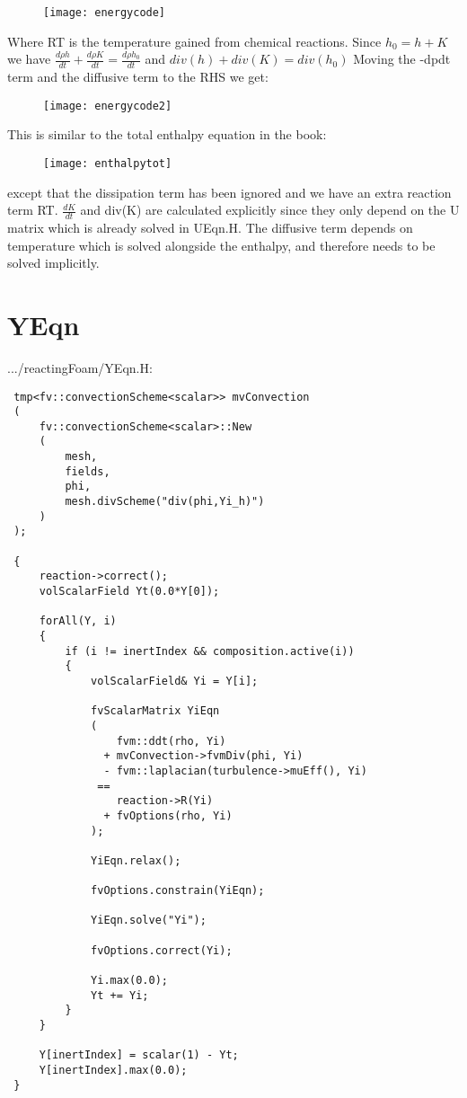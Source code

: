 \begin{figure}[H]
\centering
\texttt{[image: energycode]}
\end{figure}

Where RT is the temperature gained from chemical reactions.
Since $h_0 = h + K$ we have $\frac{d \rho h}{dt} + \frac{d \rho K}{dt} = \frac{d \rho h_0}{dt}$ and $div(h) + div(K) = div(h_0)$
\vspace{\baselineskip}
Moving the -dpdt term and the diffusive term to the RHS we get:

\begin{figure}[H]
\centering
\texttt{[image: energycode2]}
\end{figure}

This is similar to the total enthalpy equation in the book:
\begin{figure}[H]
\centering
\texttt{[image: enthalpytot]}
\end{figure}
except that the dissipation term has been ignored and we have an extra reaction term RT.
\vspace{\baselineskip}
$\frac{dK}{dt}$ and div(K) are calculated explicitly since they only depend on the U matrix which is already solved in UEqn.H. The diffusive term depends on temperature which is solved alongside the enthalpy, and therefore needs to be solved implicitly.

\section{YEqn}

.../reactingFoam/YEqn.H:
\begin{verbatim}
 tmp<fv::convectionScheme<scalar>> mvConvection
 (
     fv::convectionScheme<scalar>::New
     (
         mesh,
         fields,
         phi,
         mesh.divScheme("div(phi,Yi_h)")
     )
 );
 
 {
     reaction->correct();
     volScalarField Yt(0.0*Y[0]);
 
     forAll(Y, i)
     {
         if (i != inertIndex && composition.active(i))
         {
             volScalarField& Yi = Y[i];
 
             fvScalarMatrix YiEqn
             (
                 fvm::ddt(rho, Yi)
               + mvConvection->fvmDiv(phi, Yi)
               - fvm::laplacian(turbulence->muEff(), Yi)
              ==
                 reaction->R(Yi)
               + fvOptions(rho, Yi)
             );
 
             YiEqn.relax();
 
             fvOptions.constrain(YiEqn);
 
             YiEqn.solve("Yi");
 
             fvOptions.correct(Yi);
 
             Yi.max(0.0);
             Yt += Yi;
         }
     }
 
     Y[inertIndex] = scalar(1) - Yt;
     Y[inertIndex].max(0.0);
 }
\end{verbatim}

